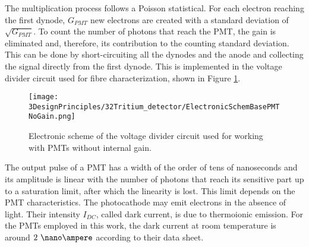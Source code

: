 \begin{enumerate}
The multiplication process follows a Poisson statistical. For each electron reaching the first dynode, $G_{PMT}$ new electrons are created with a standard deviation of $\sqrt{G_{PMT}}$. To count the number of photons that reach the PMT, the gain is eliminated and, therefore, its contribution to the counting standard deviation. This can be done by short-circuiting all the dynodes and the anode and collecting the signal directly from the first dynode. This is implemented in the voltage divider circuit used for fibre characterization, shown in Figure \ref{fig:ElectronicSchemeBasePMTNoGain}.
\begin{figure}[htbp]
\centering
\texttt{[image: 3DesignPrinciples/32Tritium\_detector/ElectronicSchemBasePMTNoGain.png]}
\caption{Electronic scheme of the voltage divider circuit used for working with PMTs without internal gain.\label{fig:ElectronicSchemeBasePMTNoGain}}
\end{figure}
\end{enumerate}
The output pulse of a PMT has a width of the order of tens of nanoseconds and its amplitude is linear with the number of photons that reach its sensitive part up to a saturation limit, after which the linearity is lost. This limit depends on the PMT characteristics. The photocathode may emit electrons in the absence of light. Their intensity $I_{DC}$, called dark current, is due to thermoionic emission. For the PMTs employed in this work, the dark current at room temperature is around $2~\nano\ampere$ according to their data sheet.

